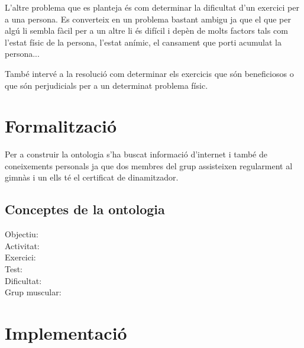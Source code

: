 \documentclass[a4paper, 12pt, UTF8]{article}
\begin{document}
L'altre problema que es planteja és com determinar la dificultat d'un exercici per a una persona. Es converteix en un problema bastant ambigu ja que el que per algú li sembla fàcil per a un altre li és difícil i depèn de molts factors tals com l'estat físic de la persona, l'estat anímic, el cansament que porti acumulat la persona...

També intervé a la resolució com determinar els exercicis que són beneficiosos o que són perjudicials per a un determinat problema físic. 

\section{Formalització}

Per a construir la ontologia s'ha buscat informació d'internet i també de coneixements personals ja que dos membres del grup assisteixen regularment al gimnàs i un ells té el certificat de dinamitzador. 

\subsection{Conceptes de la ontologia}

\begin{description}
	\item[Objectiu:] 
	\item[Activitat:]
	\item[Exercici:]
	\item[Test:]
	\item[Dificultat:]
	\item[Grup muscular:]
\end{description}

\section{Implementació}
\end{document}
